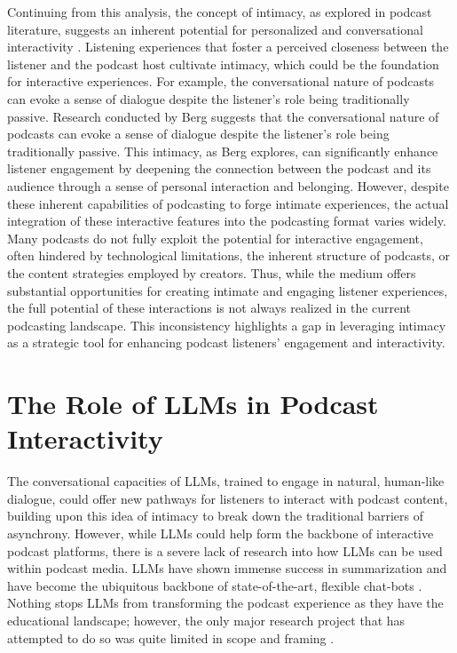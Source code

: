 \documentclass[12pt]{report}
\begin{document}
\begin{myfont}
        \indent Continuing from this analysis, the concept of intimacy, as explored in podcast literature, suggests an inherent potential for personalized and conversational interactivity \citep{Berg2023Analysing}. Listening experiences that foster a perceived closeness between the listener and the podcast host cultivate intimacy, which could be the foundation for interactive experiences. For example, the conversational nature of podcasts can evoke a sense of dialogue despite the listener's role being traditionally passive. Research conducted by Berg \citep{Berg2023Analysing} suggests that the conversational nature of podcasts can evoke a sense of dialogue despite the listener's role being traditionally passive. This intimacy, as Berg explores, can significantly enhance listener engagement by deepening the connection between the podcast and its audience through a sense of personal interaction and belonging. However, despite these inherent capabilities of podcasting to forge intimate experiences, the actual integration of these interactive features into the podcasting format varies widely. Many podcasts do not fully exploit the potential for interactive engagement, often hindered by technological limitations, the inherent structure of podcasts, or the content strategies employed by creators. Thus, while the medium offers substantial opportunities for creating intimate and engaging listener experiences, the full potential of these interactions is not always realized in the current podcasting landscape. This inconsistency highlights a gap in leveraging intimacy as a strategic tool for enhancing podcast listeners' engagement and interactivity.
        
        \section{The Role of LLMs in Podcast Interactivity}
        \indent The conversational capacities of LLMs, trained to engage in natural, human-like dialogue, could offer new pathways for listeners to interact with podcast content, building upon this idea of intimacy to break down the traditional barriers of asynchrony. However, while LLMs could help form the backbone of interactive podcast platforms, there is a severe lack of research into how LLMs can be used within podcast media. LLMs have shown immense success in summarization and have become the ubiquitous backbone of state-of-the-art, flexible chat-bots \citep{OpenAI2023GPT4}. Nothing stops LLMs from transforming the podcast experience as they have the educational landscape; however, the only major research project that has attempted to do so was quite limited in scope and framing \citep{Laban2022NewsPod}.
        

\end{myfont}
\end{document}
